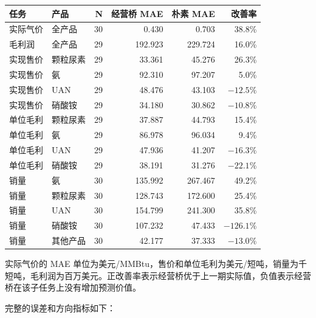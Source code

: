 \documentclass[11pt,a4paper]{ctexart}
\begin{document}
\begin{center}
\small
\begin{tabularx}{\textwidth}{L{3.1cm}Y r r r r}
\toprule
任务 & 产品 & N & 经营桥 MAE & 朴素 MAE & 改善率 \\
\midrule
实际气价 & 全产品 & 30 & 0.430 & 0.703 & 38.8\% \\
毛利润 & 全产品 & 29 & 192.923 & 229.724 & 16.0\% \\
实现售价 & 颗粒尿素 & 29 & 33.361 & 45.276 & 26.3\% \\
实现售价 & 氨 & 29 & 92.310 & 97.207 & 5.0\% \\
实现售价 & UAN & 29 & 48.476 & 43.103 & $-12.5\%$ \\
实现售价 & 硝酸铵 & 29 & 34.180 & 30.862 & $-10.8\%$ \\
单位毛利 & 颗粒尿素 & 29 & 37.887 & 44.793 & 15.4\% \\
单位毛利 & 氨 & 29 & 86.978 & 96.034 & 9.4\% \\
单位毛利 & UAN & 29 & 47.936 & 41.207 & $-16.3\%$ \\
单位毛利 & 硝酸铵 & 29 & 38.191 & 31.276 & $-22.1\%$ \\
销量 & 氨 & 30 & 135.992 & 267.467 & 49.2\% \\
销量 & 颗粒尿素 & 30 & 128.743 & 172.600 & 25.4\% \\
销量 & UAN & 30 & 154.799 & 241.300 & 35.8\% \\
销量 & 硝酸铵 & 30 & 107.232 & 47.433 & $-126.1\%$ \\
销量 & 其他产品 & 30 & 42.177 & 37.333 & $-13.0\%$ \\
\bottomrule
\end{tabularx}
\normalsize
\end{center}

实际气价的 MAE 单位为美元/MMBtu，售价和单位毛利为美元/短吨，销量为千短吨，毛利润为百万美元。正改善率表示经营桥优于上一期实际值，负值表示经营桥在该子任务上没有增加预测价值。

完整的误差和方向指标如下：
\end{document}
